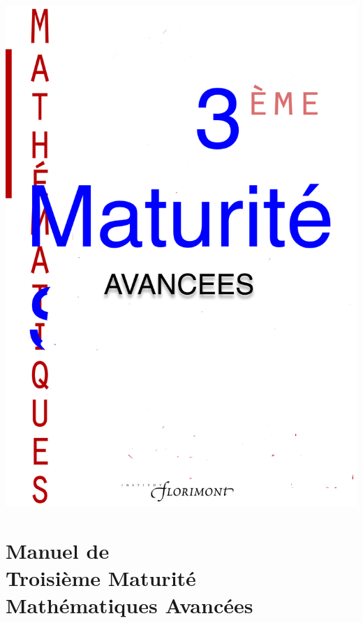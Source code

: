 \documentclass[TS]{sesamanuel}
\begin{document}
\pagestyle{empty}

\includegraphics[width=.92\textwidth]{couverture}

\newpage \pagestyle{empty}
\addto\captionsfrench{\renewcommand{\contentsname}{Sommaire}}




\themaM %
\chapter{Manuel de\\Troisième Maturité\\Mathématiques Avancées}

\vfill
\end{document}
